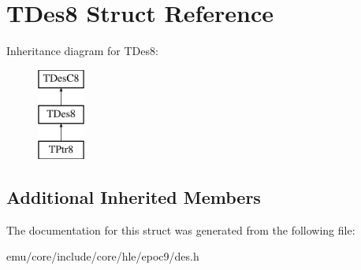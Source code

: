 \hypertarget{struct_t_des8}{}\section{T\+Des8 Struct Reference}
\label{struct_t_des8}
Inheritance diagram for T\+Des8\+:\begin{figure}[H]
\begin{center}
\leavevmode
\includegraphics[height=3.000000cm]{struct_t_des8}
\end{center}
\end{figure}
\subsection*{Additional Inherited Members}


The documentation for this struct was generated from the following file\+:\begin{DoxyCompactItemize}
\item 
emu/core/include/core/hle/epoc9/des.\+h\end{DoxyCompactItemize}
